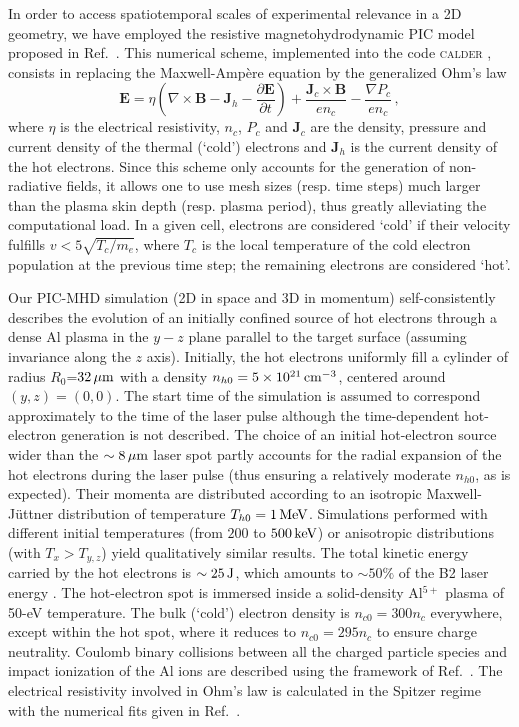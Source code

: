 \documentclass[aps,twocolumn,showpacs,superscriptaddress]{revtex4}
\begin{document}
In order to access spatiotemporal scales of experimental relevance in a 2D geometry, we have employed the resistive magnetohydrodynamic PIC model proposed in Ref.~\cite{JCP_Cohen_2010}. This numerical scheme, implemented into the code \textsc{calder} \cite{NF_Lefebvre_2003}, consists in replacing the Maxwell-Amp\`ere equation by the generalized Ohm's law
\begin{equation} \label{eq:PICMHD}
  \mathbf{E}=\eta \left(\nabla \times \mathbf{B}-\mathbf{J}_h-\frac{\partial \mathbf{E}}{\partial t}\right)+\frac{\mathbf{J}_c\times \mathbf{B}}{en_c}
  -\frac{\nabla P_c}{en_c} \,,
\end{equation}
where $\eta$ is the electrical resistivity, $n_c$, $P_c$ and $\mathbf{J}_c$ are the density, pressure and current density of the thermal (`cold') electrons and $\mathbf{J}_h$ is the current density of the hot electrons. Since this scheme only accounts for the generation of non-radiative fields, it allows one to use mesh sizes (resp. time steps) much larger than the plasma skin depth (resp. plasma period), thus greatly alleviating the computational load. In a given cell, electrons are considered `cold' if their velocity fulfills $v<5\sqrt{T_c/m_e}$, where $T_c$ is the local temperature of the cold electron population at the previous time step; the remaining electrons are considered `hot'.

Our PIC-MHD simulation (2D in space and 3D in momentum) self-consistently describes the evolution of an initially confined source of hot electrons through a dense Al plasma in the $y-z$ plane parallel to the target surface (assuming invariance along the $z$ axis). Initially, the hot electrons uniformly fill a cylinder of radius $R_{0}$=$32\,\rm \mu m$  with a density $n_{h0}=5\times 10^{21}\,\rm cm^{-3}$, centered around $(y,z)=(0,0)$. 
The start time of the simulation is assumed to correspond approximately to the time of the laser pulse although the time-dependent hot-electron generation is not described.
The choice of an initial hot-electron source wider than the $\sim 8\,\rm \mu m$ laser spot partly accounts for the radial expansion of the hot electrons during the laser pulse \cite{PRE_Stephens_2004} (thus ensuring a relatively moderate $n_{h0}$, as is expected). Their momenta are distributed according to an isotropic Maxwell-J\"uttner distribution of temperature $T_{h0}=1\,\rm MeV$. Simulations performed with different initial temperatures (from $200$ to $500\,\rm keV$) or anisotropic distributions (with $T_x>T_{y,z}$) yield qualitatively similar results. The total kinetic energy carried by the hot electrons is $\sim 25\,\rm J$, which amounts to $\sim 50\%$ of the B2 laser energy \cite{PRL_Ping_2008}. The hot-electron spot is immersed inside a solid-density Al$^{5+}$ plasma of \mbox{50-eV} temperature. The bulk (`cold') electron density is $n_{c0}=300n_c$ everywhere, except within the hot spot, where it reduces to $n_{c0}=295n_c$ to ensure charge neutrality. Coulomb binary collisions between all the charged particle species and impact ionization of the Al ions are described using the framework of Ref.~\cite{POP_Perez_2012}. The electrical resistivity involved in Ohm's law is calculated in the Spitzer regime with the numerical fits given in Ref.~\cite{Decoster_1998}. 
\end{document}
